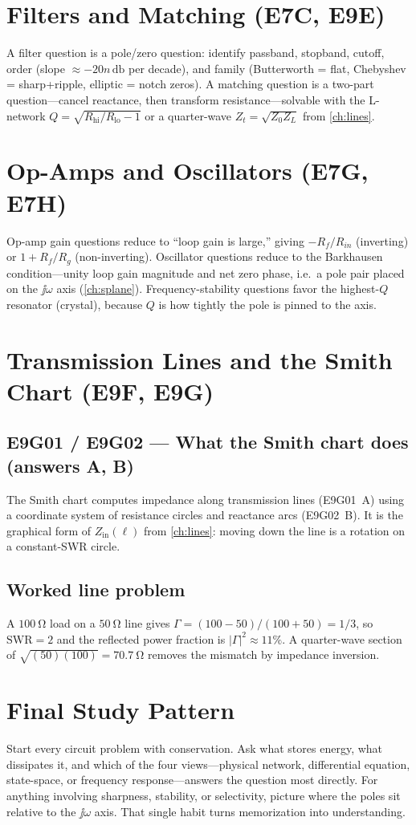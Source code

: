 \section{Filters and Matching (E7C, E9E)}
A filter question is a pole/zero question: identify passband, stopband, cutoff,
order (slope \(\approx-20n\,\si{\decibel}\) per decade), and family
(Butterworth = flat, Chebyshev = sharp+ripple, elliptic = notch zeros). A
matching question is a two-part question---cancel reactance, then transform
resistance---solvable with the L-network \(Q=\sqrt{R_{\text{hi}}/R_{\text{lo}}-1}\)
or a quarter-wave \(Z_t=\sqrt{Z_0Z_L}\) from \cref{ch:lines}.

\section{Op-Amps and Oscillators (E7G, E7H)}
Op-amp gain questions reduce to ``loop gain is large,'' giving
\(-R_f/R_{in}\) (inverting) or \(1+R_f/R_g\) (non-inverting). Oscillator questions
reduce to the Barkhausen condition---unity loop gain magnitude and net zero
phase, i.e.\ a pole pair placed on the \(\jj\omega\) axis
(\cref{ch:splane}). Frequency-stability questions favor the highest-\(Q\)
resonator (crystal), because \(Q\) is how tightly the pole is pinned to the axis.

\section{Transmission Lines and the Smith Chart (E9F, E9G)}

\subsection*{E9G01 / E9G02 --- What the Smith chart does (answers A, B)}
The Smith chart computes impedance along transmission lines (E9G01~A) using a
coordinate system of resistance circles and reactance arcs (E9G02~B). It is the
graphical form of \(Z_{\mathrm{in}}(\ell)\) from \cref{ch:lines}: moving down the
line is a rotation on a constant-SWR circle.

\subsection*{Worked line problem}
A \(\SI{100}{\ohm}\) load on a \(\SI{50}{\ohm}\) line gives
\(\Gamma=(100-50)/(100+50)=1/3\), so \(\mathrm{SWR}=2\) and the reflected power
fraction is \(|\Gamma|^2\approx11\%\). A quarter-wave section of
\(\sqrt{(50)(100)}=\SI{70.7}{\ohm}\) removes the mismatch by impedance inversion.

\section{Final Study Pattern}
Start every circuit problem with conservation. Ask what stores energy, what
dissipates it, and which of the four views---physical network, differential
equation, state-space, or frequency response---answers the question most directly. For anything
involving sharpness, stability, or selectivity, picture where the poles sit
relative to the \(\jj\omega\) axis. That single habit turns memorization into
understanding.
